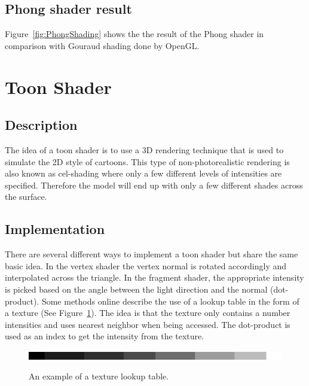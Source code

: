 \documentclass[a4paper,12pt]{article}
\begin{document}


\subsection{Phong shader result}
\label{sec:PhongShaderResult}
Figure~\ref{fig:PhongShading} shows the the result of the Phong shader in comparison with Gouraud shading done by OpenGL.


\section{Toon Shader}
\label{sec:ToonShader}
\subsection{Description}
\label{sec:DescriptionToonShader}

The idea of a toon shader is to use a 3D rendering technique that is used to simulate the 2D style of cartoons. This type of non-photorealistic rendering is also known as cel-shading where only a few different levels of intensities are specified. Therefore the model will end up with only a few different shades across the surface.

\subsection{Implementation}
\label{sec:ImplementationToonShader}

There are several different ways to implement a toon shader but share the same basic idea. In the vertex shader the vertex normal is rotated accordingly and interpolated across the triangle. In the fragment shader, the appropriate intensity is picked based on the angle between the light direction and the normal (dot-product). Some methods online describe the use of a lookup table in the form of a texture (See Figure~\ref{fig:TextureLUT}). The idea is that the texture only contains a number intensities and uses nearest neighbor when being accessed. The dot-product is used as an index to get the intensity from the texture.

\begin{figure}[h]
  \begin{center}
		\scalebox{0.5} {\includegraphics[width=512px]{images/lightmap.png}}
    \caption{An example of a texture lookup table.}
    \label{fig:TextureLUT}
  \end{center}
\end{figure}
\end{document}
